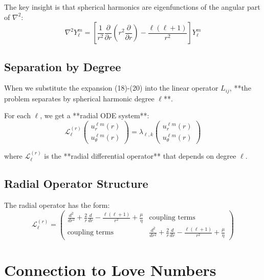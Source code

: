 \documentclass{article}
\begin{document}
The key insight is that spherical harmonics are eigenfunctions of the angular part of $\nabla^2$:
\begin{equation}
\nabla^2 Y_\ell^m = \left[\frac{1}{r^2}\frac{\partial}{\partial r}\left(r^2\frac{\partial}{\partial r}\right) - \frac{\ell(\ell+1)}{r^2}\right] Y_\ell^m
\end{equation}

\subsection{Separation by Degree}

When we substitute the expansion (18)-(20) into the linear operator $L_{ij}$, **the problem separates by spherical harmonic degree $\ell$**.

For each $\ell$, we get a **radial ODE system**:
\begin{equation}
\mathcal{L}_\ell^{(r)} \begin{pmatrix} u_r^{\ell m}(r) \\ u_\theta^{\ell m}(r) \end{pmatrix} = \lambda_{\ell,k} \begin{pmatrix} u_r^{\ell m}(r) \\ u_\theta^{\ell m}(r) \end{pmatrix}
\end{equation}

where $\mathcal{L}_\ell^{(r)}$ is the **radial differential operator** that depends on degree $\ell$.

\subsection{Radial Operator Structure}

The radial operator has the form:
\begin{equation}
\mathcal{L}_\ell^{(r)} = \begin{pmatrix}
\frac{d^2}{dr^2} + \frac{2}{r}\frac{d}{dr} - \frac{\ell(\ell+1)}{r^2} + \frac{\mu}{\eta} & \text{coupling terms} \\
\text{coupling terms} & \frac{d^2}{dr^2} + \frac{2}{r}\frac{d}{dr} - \frac{\ell(\ell+1)}{r^2} + \frac{\mu}{\eta}
\end{pmatrix}
\end{equation}

\section{Connection to Love Numbers}
\end{document}
